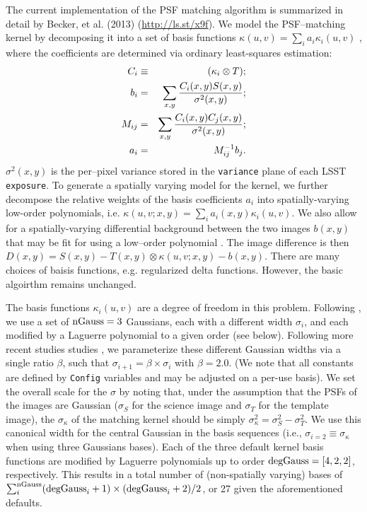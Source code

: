 The current implementation of the PSF matching algorithm is summarized in detail by Becker, et al. (2013) (\url{http://ls.st/x9f}).  We model the PSF--matching kernel by decomposing it into a set of basis functions $\kappa(u,v) = \sum_i a_i \kappa_i(u,v)$ \citep{Alard98}, where the coefficients are determined via ordinary least-squares estimation:
%
\begin{eqnarray}
C_i & \equiv & (\kappa_i \otimes T); \\ \nonumber
b_{i}  & = & \sum_{x,y} {{C_i(x,y) S(x,y)}\over{\sigma^2(x,y)}};   \nonumber \\ 
M_{ij} & = & \sum_{x,y} {{C_i(x,y) C_j(x,y)}\over{\sigma^2(x,y)}};  \nonumber \\ 
a_{i}  & = & M^{-1}_{ij} b_{j}. \nonumber 
\label{eq-soln}
\end{eqnarray}
%
\noindent
$\sigma^2(x,y)$ is the per--pixel variance stored in the {\tt   variance} plane of each LSST {\tt exposure}. To generate a spatially varying model for the kernel, we further decompose the relative weights of the basis coefficients $a_i$ into spatially-varying low-order polynomials, i.e. $\kappa(u,v;x,y) = \sum_i a_i(x,y) \kappa_i(u,v)$. We also allow for a spatially-varying differential background between the two images $b(x,y)$ that may be fit for using a low--order polynomial \citep{Alard98,Alard00}. The image difference is then $D(x,y) = S(x,y) - T(x,y) \otimes \kappa(u,v;x,y) - b(x,y)$.  There are many choices of baisis functions, e.g. regularized delta functions.  However, the basic algoirthm remains unchanged. 

The basis functions $\kappa_i(u,v)$ are a degree of freedom in this problem. Following \citep{Alard98}, we use a set of $\rm nGauss = 3$ Gaussians, each with a different width $\sigma_i$, and each modified by a Laguerre polynomial to a given order (see below). Following more recent studies studies \citep[e.g.][]{Israel07}, we parameterize these different Gaussian widths via a single ratio $\beta$, such that $\sigma_{i+1} = \beta \times \sigma_{i}$ with $\beta = 2.0$. (We note that all constants are defined by {\tt Config} variables and may be adjusted on a per-use basis). We set the overall scale for the $\sigma$ by noting that, under the assumption that the PSFs of the images are Gaussian ($\sigma_S$ for the science image and $\sigma_T$ for the template image), the $\sigma_{\kappa}$ of the matching kernel should be simply $\sigma_{\kappa}^2 = \sigma_S^2 - \sigma_T^2$. We use this canonical width for the central Gaussian in the basis sequences (i.e., $\sigma_{i=2} \equiv \sigma_{\kappa}$ when using three Gaussians bases). Each of the three default kernel basis functions are modified by Laguerre polynomials up to order $\rm degGauss = [4, 2,   2]$, respectively. This results in a total number of (non-spatially varying) bases of $\sum_i^{\rm nGauss} ({\rm degGauss}_i+1)\times({\rm   degGauss}_i+2)/2$, or 27 given the aforementioned defaults. 

